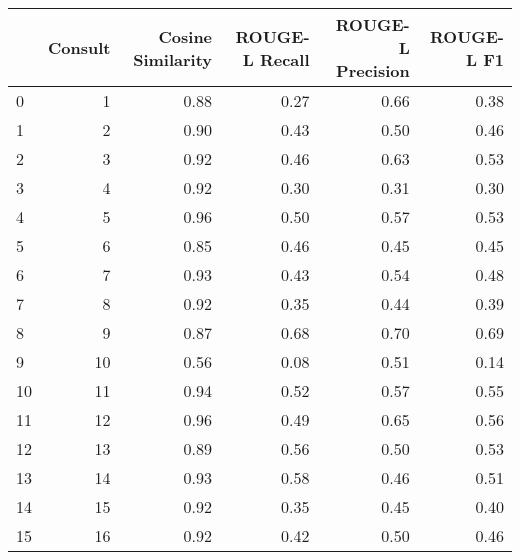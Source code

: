 \begin{tabular}{lrrrrr}
\toprule
 & Consult & Cosine Similarity & ROUGE-L Recall & ROUGE-L Precision & ROUGE-L F1 \\
\midrule
0 & 1 & 0.88 & 0.27 & 0.66 & 0.38 \\
1 & 2 & 0.90 & 0.43 & 0.50 & 0.46 \\
2 & 3 & 0.92 & 0.46 & 0.63 & 0.53 \\
3 & 4 & 0.92 & 0.30 & 0.31 & 0.30 \\
4 & 5 & 0.96 & 0.50 & 0.57 & 0.53 \\
5 & 6 & 0.85 & 0.46 & 0.45 & 0.45 \\
6 & 7 & 0.93 & 0.43 & 0.54 & 0.48 \\
7 & 8 & 0.92 & 0.35 & 0.44 & 0.39 \\
8 & 9 & 0.87 & 0.68 & 0.70 & 0.69 \\
9 & 10 & 0.56 & 0.08 & 0.51 & 0.14 \\
10 & 11 & 0.94 & 0.52 & 0.57 & 0.55 \\
11 & 12 & 0.96 & 0.49 & 0.65 & 0.56 \\
12 & 13 & 0.89 & 0.56 & 0.50 & 0.53 \\
13 & 14 & 0.93 & 0.58 & 0.46 & 0.51 \\
14 & 15 & 0.92 & 0.35 & 0.45 & 0.40 \\
15 & 16 & 0.92 & 0.42 & 0.50 & 0.46 \\
\bottomrule
\end{tabular}
